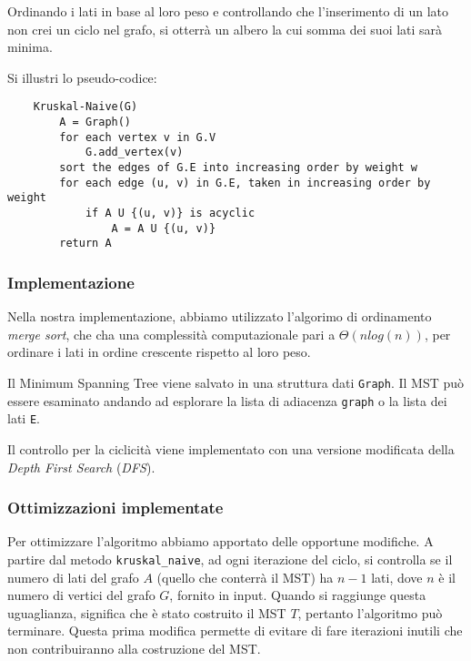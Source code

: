 Ordinando i lati in base al loro peso e controllando che l'inserimento
di un lato non crei un ciclo nel grafo, si otterrà un albero la cui
somma dei suoi lati sarà minima.

Si illustri lo pseudo-codice:
\begin{verbatim}
    Kruskal-Naive(G)
        A = Graph()
        for each vertex v in G.V
            G.add_vertex(v)
        sort the edges of G.E into increasing order by weight w
        for each edge (u, v) in G.E, taken in increasing order by weight
            if A U {(u, v)} is acyclic
                A = A U {(u, v)}
        return A
\end{verbatim}

\subsubsection{Implementazione}

Nella nostra implementazione, abbiamo utilizzato l'algorimo di
ordinamento \textit{merge sort}, che cha una complessità
computazionale pari a $\Theta(n log(n))$, per ordinare i lati
in ordine crescente rispetto al loro peso.

Il Minimum Spanning Tree viene salvato in una struttura dati
\verb|Graph|. Il MST può essere esaminato andando ad
esplorare la lista di adiacenza \verb|graph| o la lista dei
lati \verb|E|.

Il controllo per la ciclicità viene implementato con una
versione modificata della \textit{Depth First Search}
(\textit{DFS}).

\subsubsection{Ottimizzazioni implementate}

Per ottimizzare l'algoritmo abbiamo apportato delle opportune
modifiche. A partire dal metodo \verb|kruskal_naive|, ad
ogni iterazione del ciclo, si controlla se il numero di lati
del grafo $A$ (quello che conterrà il MST) ha $n - 1$ lati,
dove $n$ è il numero di vertici del grafo $G$, fornito in input.
Quando si raggiunge questa uguaglianza, significa che è stato
costruito il MST $T$, pertanto l'algoritmo può terminare.
Questa prima modifica permette di evitare di fare iterazioni
inutili che non contribuiranno alla costruzione del MST.

